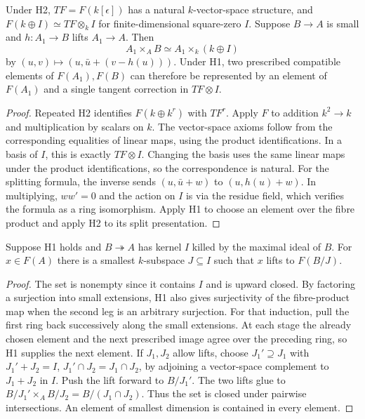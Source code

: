 \begin{proposition}\label{res:T07}
Under H2, \(TF=F(k[\epsilon])\) has a natural \(k\)-vector-space structure,
and \(F(k\oplus I)\simeq TF\otimes_k I\) for finite-dimensional
square-zero \(I\). Suppose \(B\to A\) is small and
\(h:A_1\to B\) lifts \(A_1\to A\). Then
\[
 A_1\times_A B \simeq A_1\times_k (k\oplus I)
\]
by \((u,v)\mapsto (u,\bar u+(v-h(u)))\).
Under H1, two prescribed compatible elements of \(F(A_1),F(B)\)
can therefore be represented by an element of \(F(A_1)\) and a
single tangent correction in \(TF\otimes I\).
\end{proposition}
\begin{proof}
Repeated H2 identifies \(F(k\oplus k^r)\) with \(TF^r\).
Apply \(F\) to addition \(k^2\to k\) and multiplication by scalars
on \(k\). The vector-space axioms follow from the corresponding
equalities of linear maps, using the product identifications.
In a basis of \(I\), this is exactly \(TF\otimes I\).
Changing the basis uses the same linear maps under the product
identifications, so the correspondence is natural.
For the splitting formula, the inverse sends
\((u,\bar u+w)\) to \((u,h(u)+w)\). In multiplying, \(w w'=0\)
and the action on \(I\) is via the residue field, which verifies
the formula as a ring isomorphism. Apply H1 to choose an element
over the fibre product and apply H2 to its split presentation.
\end{proof}

\begin{lemma}\label{res:T08}
Suppose H1 holds and \(B\twoheadrightarrow A\) has kernel \(I\)
killed by the maximal ideal of \(B\). For \(x\in F(A)\) there
is a smallest \(k\)-subspace \(J\subseteq I\) such that \(x\)
lifts to \(F(B/J)\).
\end{lemma}
\begin{proof}
The set is nonempty since it contains \(I\) and is upward closed.
By factoring a surjection into small extensions, H1 also gives
surjectivity of the fibre-product map when the second leg is an
arbitrary surjection. For that induction, pull the first ring
back successively along the small extensions. At each stage the
already chosen element and the next prescribed image agree over
the preceding ring, so H1 supplies the next element.
If \(J_1,J_2\) allow lifts, choose \(J_1'\supseteq J_1\) with
\(J_1'+J_2=I\), \(J_1'\cap J_2=J_1\cap J_2\), by adjoining a
vector-space complement to \(J_1+J_2\) in \(I\).
Push the lift forward to \(B/J_1'\).
The two lifts glue to \(B/J_1'\times_A B/J_2=B/(J_1\cap J_2)\).
Thus the set is closed under pairwise intersections.
An element of smallest dimension is contained in every element.
\end{proof}

